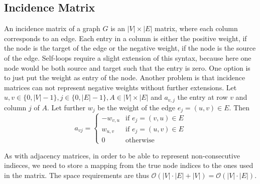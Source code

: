         \subsection*{Incidence Matrix}
            An incidence matrix of a graph $G$ is an $|V| \times |E|$ matrix, where each column corresponds to an edge. Each entry in a column is either the positive weight, if the node is the target of the edge or the negative weight, if the node is the source of the edge. Self-loops require a slight extension of this syntax, because here one node would be both source and target such that the entry is zero. One option is to just put the weight as entry of the node.  Another problem is that incidence matrices can not represent negative weights without further extensions.        
            Let $u,v \in \{0, |V|-1\}, j \in \{0, |E|-1\}, A \in |V| \times |E|$ and $a_{v,j}$ the entry at row $v$ and column $j$ of $A$. Let further $w_j$ be the weight of the edge $e_j = (u,v) \in E$. Then 
            \[         a_{vj} = \begin{cases}
                        -w_{v,u} & \text{if } e_j = (v,u) \in E \\
                        w_{u,v} & \text{if } e_j = (u,v) \in E \\
                        0 & \text{otherwise}
                        \end{cases}
            \]
            
            As with adjacency matrices, in order to be able to represent non-consecutive indieces, we need to store a mapping from the true node indices to the ones used in the matrix.
            The space requirements are thus $\mathcal{O}(|V| \cdot |E| + |V|) = \mathcal{O}(|V| \cdot |E|)$.
            
